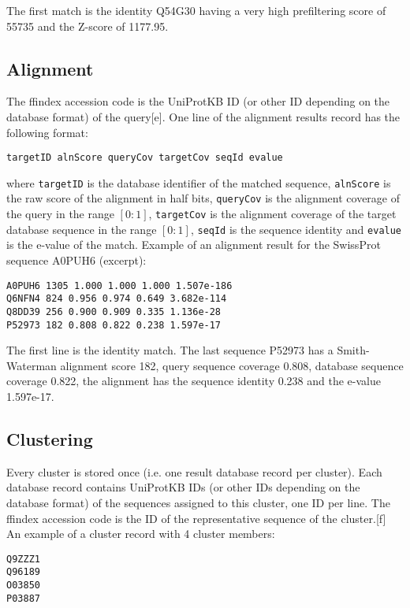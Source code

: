 \documentclass[11pt,a4paper]{scrreprt}
\begin{document}
The first match is the identity Q54G30 having a very high prefiltering score of 55735 and the Z-score of 1177.95. 
\subsection{Alignment}
The ffindex accession code is the UniProtKB ID (or other ID depending on the database format) of the query[e]. One line of the alignment results record has the following format:


\begin{verbatim}
targetID alnScore queryCov targetCov seqId evalue
\end{verbatim}


where \texttt{targetID} is the database identifier of the matched sequence, \texttt{alnScore} is the raw score of the alignment in half bits, \texttt{queryCov} is the alignment coverage of the query in the range $[0:1]$, \texttt{targetCov} is the alignment coverage of the target database sequence in the range $[0:1]$, \texttt{seqId} is the sequence identity and \texttt{evalue} is the e-value of the match. Example of an alignment result for the SwissProt sequence A0PUH6 (excerpt):


\begin{verbatim}
A0PUH6 1305 1.000 1.000 1.000 1.507e-186
Q6NFN4 824 0.956 0.974 0.649 3.682e-114
Q8DD39 256 0.900 0.909 0.335 1.136e-28
P52973 182 0.808 0.822 0.238 1.597e-17
\end{verbatim}


The first line is the identity match. The last sequence P52973 has a Smith-Waterman alignment score 182, query sequence coverage 0.808, database sequence coverage 0.822, the alignment has the sequence identity 0.238 and the e-value 1.597e-17.
\subsection{Clustering}
Every cluster is stored once (i.e. one result database record per cluster). Each database record contains UniProtKB IDs (or other IDs depending on the database format) of the sequences assigned to this cluster, one ID per line. The ffindex accession code is the ID of the representative sequence of the cluster.[f] An example of a cluster record with 4 cluster members:


\begin{verbatim}
Q9ZZZ1
Q96189
O03850
P03887
\end{verbatim}
\end{document}
